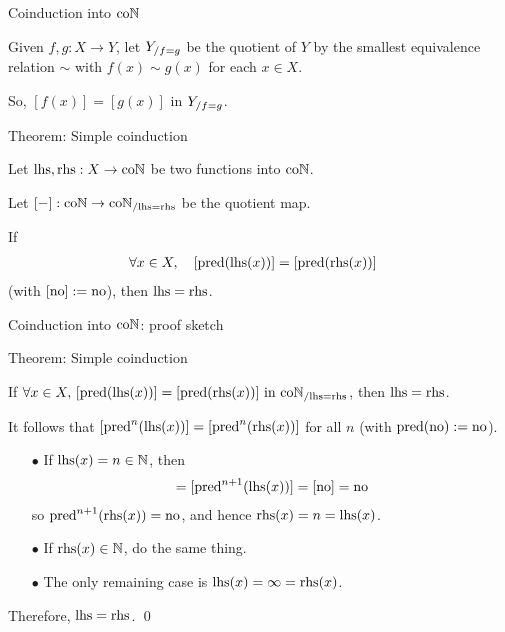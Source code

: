 
\begin{frame}[t]{Coinduction into $\mathrm{co}\mathbb{N}$} %

  \par Given $f, g : X \to Y$, let ${Y}_{/ {f = g}}$ be the quotient of $Y$ by the smallest equivalence relation $\sim$ with $f(x) \sim g(x)$ for each $x \in X$.
  \vspace{0.5 \baselineskip}
  \pause
  \par So, $[f(x)] = [g(x)]$ in ${Y}_{/ {f = g}}$.

  \pause
  
  \begin{block}{Theorem: Simple coinduction}
    \par Let $\mathrm{lhs}, \mathrm{rhs} : X \to \mathrm{co}\mathbb{N}$ be two functions into $\mathrm{co}\mathbb{N}$.
    \par Let $[{-}] : \mathrm{co}\mathbb{N} \to {\mathrm{co}\mathbb{N}}_{/ {\mathrm{lhs} = \mathrm{rhs}}}$ be the quotient map.
    \par If
    \begin{align*}
      \forall x \in X,\quad
      [\operatorname{pred} (\mathrm{lhs} (x))]
      &= [\operatorname{pred} (\mathrm{rhs} (x))]
    \end{align*}
    (with $[\mathrm{no}] := \mathrm{no}$){\pause}, then $\mathrm{lhs} = \mathrm{rhs}$.
  \end{block}

\end{frame}

\begin{frame}[t]{Coinduction into $\mathrm{co}\mathbb{N}$: proof sketch} %
  
  \begin{block}{Theorem: Simple coinduction}
    \par If $\forall x \in X,\,
      [\operatorname{pred} (\mathrm{lhs} (x))]
      = [\operatorname{pred} (\mathrm{rhs} (x))]
      \text{ in } {\mathrm{co}\mathbb{N}}_{/ {\mathrm{lhs} = \mathrm{rhs}}}
    $, then $\mathrm{lhs} = \mathrm{rhs}$.
  \end{block}
  \par{}
  \par It follows that $[\operatorname{pred}^n (\mathrm{lhs}(x))] = [\operatorname{pred}^n (\mathrm{rhs}(x))]$ for all $n$ (with $\operatorname{pred}(\mathrm{no}) := \mathrm{no}$).
  \pause
  \begin{itemize}
    \item[$\bullet$] {
      If $\mathrm{lhs}(x) = n \in \mathbb{N}$, then
      \begin{align*}
        [\pred^{n + 1} (\rhs(x))]
        = [\pred^{n + 1} (\lhs(x))]
        = [\no]
        = \no
      \end{align*}
      so $\operatorname{pred}^{n + 1} (\mathrm{rhs}(x)) = \mathrm{no}$, and hence $\mathrm{rhs}(x) = n = \mathrm{lhs}(x)$.
    }\pause
    \item[$\bullet$] {
      If $\mathrm{rhs}(x) \in \mathbb{N}$, do the same thing.
    }\pause
    \item[$\bullet$] {
      The only remaining case is $\mathrm{lhs}(x) = \infty = \mathrm{rhs}(x)$.
    }\pause
  \end{itemize}
  \par Therefore, $\mathrm{lhs} = \mathrm{rhs}$. \qed

\end{frame}
